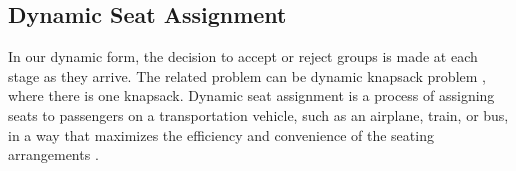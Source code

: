 




\subsection{Dynamic Seat Assignment}
In our dynamic form, the decision to accept or reject groups is made at each stage as they arrive. The related problem can be dynamic knapsack problem \cite{kleywegt1998dynamic}, where there is one knapsack. Dynamic seat assignment is a process of assigning seats to passengers on a transportation vehicle, such as an airplane, train, or bus, in a way that maximizes the efficiency and convenience of the seating arrangements \cite{hamdouch2011schedule, berge1993demand, zhu2023assign}. 



